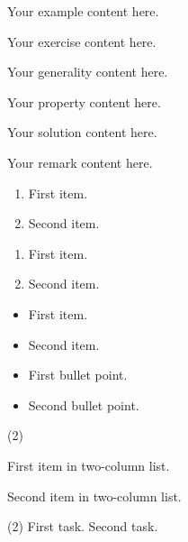 \documentclass[12pt,a4paper,violet]{bbe}
\begin{document}
\begin{example}
Your example content here.
\end{example}

\begin{exercise}
Your exercise content here.
\end{exercise}

\begin{generality}
Your generality content here.
\end{generality}

\begin{property}
Your property content here.
\end{property}

\begin{solution}
Your solution content here.
\end{solution}

\begin{remark}
Your remark content here.
\end{remark}

\begin{enumerate}[1] %
    \item First item.
    \item Second item.
\end{enumerate}

\begin{enumerate}[a] %
    \item First item.
    \item Second item.
\end{enumerate}

\begin{itemize}[f1] %
    \item First item.
    \item Second item.
\end{itemize}

\begin{itemize}[b] %
    \item First bullet point.
    \item Second bullet point.
\end{itemize}

\begin{Enumerate}(2) %
    \item First item in two-column list.
    \item Second item in two-column list.
\end{Enumerate}

\begin{tasks}(2) %
    \task First task.
    \task Second task.
\end{tasks}
\end{document}
